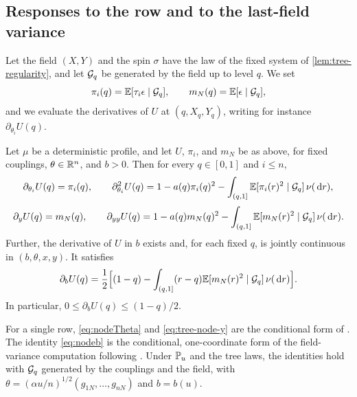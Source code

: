 \subsection{Responses to the row and to the last-field variance}

Let the field $(X,Y)$ and the spin $\sigma$ have the law of the fixed
system of \cref{lem:tree-regularity}, and let $\mathcal G_q$ be generated by
the field up to level $q$. We set
\[
 \pi_i(q)=\mathbb E[\tau_i\epsilon\mid\mathcal G_q],\qquad
 m_N(q)=\mathbb E[\epsilon\mid\mathcal G_q],
\]
and we evaluate the derivatives of $U$ at $(q,X_q,Y_q)$, writing for
instance $\partial_{\theta_i}U(q)$.

\begin{lemma}\label{lem:tree-responses}
Let $\mu$ be a deterministic profile, and let $U$, $\pi_i$, and $m_N$ be
as above, for fixed couplings, $\theta\in\mathbb R^n$, and $b>0$. Then for every
$q\in[0,1]$ and $i\le n$,
\begin{equation}\label{eq:nodeTheta}
 \partial_{\theta_i}U(q)=\pi_i(q),\qquad
 \partial_{\theta_i}^2U(q)
 =1-a(q)\pi_i(q)^2-\int_{(q,1]}\mathbb E[\pi_i(r)^2\mid\mathcal G_q]\,\nu(\,\mathrm d r),
\end{equation}
\begin{equation}\label{eq:tree-node-y}
 \partial_yU(q)=m_N(q),\qquad
 \partial_{yy}U(q)
 =1-a(q)m_N(q)^2-\int_{(q,1]}\mathbb E[m_N(r)^2\mid\mathcal G_q]\,\nu(\,\mathrm d r).
\end{equation}
Further, the derivative of $U$ in $b$ exists and, for each fixed $q$, is
jointly continuous in $(b,\theta,x,y)$. It satisfies
\begin{equation}\label{eq:nodeb}
 \partial_bU(q)=\frac12\Bigl[(1-q)-\int_{(q,1]}(r-q)
                   \mathbb E[m_N(r)^2\mid\mathcal G_q]\,\nu(\,\mathrm d r)\Bigr].
\end{equation}
In particular, $0\le\partial_bU(q)\le(1-q)/2$.
\end{lemma}

For a single row, \eqref{eq:nodeTheta} and \eqref{eq:tree-node-y} are
the conditional form of \cite[(2.10)]{AL}. The identity \eqref{eq:nodeb}
is the conditional, one-coordinate form of the field-variance computation
following \cite[(2.11)]{AL}. Under $\mathbb P_u$ and the tree laws, the
identities hold with $\mathcal G_q$ generated by the couplings and the field,
with $\theta=(\alpha u/n)^{1/2}(g_{1N},\ldots,g_{nN})$ and $b=b(u)$.

